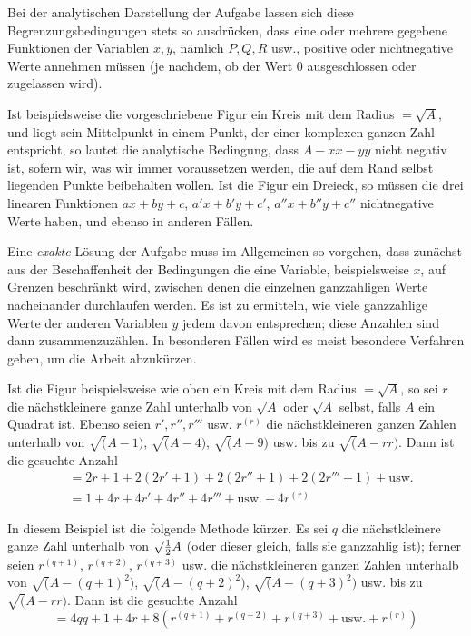 Bei der analytischen Darstellung der Aufgabe lassen sich diese Begrenzungsbedingungen stets so ausdrücken, dass eine oder mehrere gegebene Funktionen der Variablen $x,y$, nämlich $P,Q,R$ usw., positive oder nichtnegative Werte annehmen müssen (je nachdem, ob der Wert $0$ ausgeschlossen oder zugelassen wird).

Ist beispielsweise die vorgeschriebene Figur ein Kreis mit dem Radius \mbox{$=\surd A$}, und liegt sein Mittelpunkt in einem Punkt, der einer komplexen ganzen Zahl entspricht, so lautet die analytische Bedingung, dass $A-xx-yy$ nicht negativ ist, sofern wir, was wir immer voraussetzen werden, die auf dem Rand selbst liegenden Punkte beibehalten wollen. Ist die Figur ein Dreieck, so müssen die drei linearen Funktionen $ax+by+c$, $a'x+b'y+c'$, $a''x+b''y+c''$ nichtnegative Werte haben, und ebenso in anderen Fällen.

Eine \emph{exakte} Lösung der Aufgabe muss im Allgemeinen so vorgehen, dass zunächst aus der Beschaffenheit der Bedingungen die eine Variable, beispielsweise $x$, auf Grenzen beschränkt wird, zwischen denen die einzelnen ganzzahligen Werte nacheinander durchlaufen werden. Es ist zu ermitteln, wie viele ganzzahlige Werte der anderen Variablen $y$ jedem davon entsprechen; diese Anzahlen sind dann zusammenzuzählen. In besonderen Fällen wird es meist besondere Verfahren geben, um die Arbeit abzukürzen.

Ist die Figur beispielsweise wie oben ein Kreis mit dem Radius \mbox{$=\surd A$}, so sei $r$ die nächstkleinere ganze Zahl unterhalb von $\surd A$ oder $\surd A$ selbst, falls $A$ ein Quadrat ist. Ebenso seien $r',r'',r'''$ usw. $r^{(r)}$ die nächstkleineren ganzen Zahlen unterhalb von $\surd(A-1)$, $\surd(A-4)$, $\surd(A-9)$ usw. bis zu $\surd(A-rr)$. Dann ist die gesuchte Anzahl
\[
\begin{aligned}
&=2r+1+2(2r'+1)+2(2r''+1)+2(2r'''+1)+\text{usw.}\\
&=1+4r+4r'+4r''+4r'''+\text{usw.}+4r^{(r)}
\end{aligned}
\]

In diesem Beispiel ist die folgende Methode kürzer. Es sei $q$ die nächstkleinere ganze Zahl unterhalb von $\surd\tfrac12 A$ (oder dieser gleich, falls sie ganzzahlig ist); ferner seien $r^{(q+1)}$, $r^{(q+2)}$, $r^{(q+3)}$ usw. die nächstkleineren ganzen Zahlen unterhalb von $\surd(A-(q+1)^2)$, $\surd(A-(q+2)^2)$, $\surd(A-(q+3)^2)$ usw. bis zu $\surd(A-rr)$. Dann ist die gesuchte Anzahl
\[
=4qq+1+4r+8(r^{(q+1)}+r^{(q+2)}+r^{(q+3)}+\text{usw.}+r^{(r)})
\]

